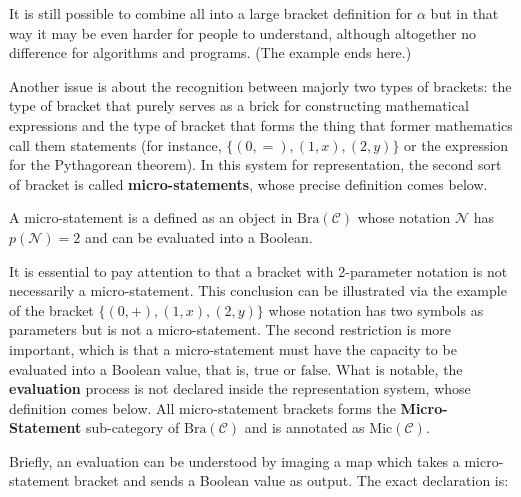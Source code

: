 \documentclass[preprint]{elsarticle}
\numberwithin{theorem}{section}	%
\numberwithin{axiom}{section}	%
\numberwithin{definition}{section}	%
\begin{document}
It is still possible to combine all into a large bracket definition for \(\alpha\) but in that way it may be even harder for people to understand, although altogether no difference for algorithms and programs. (The example ends here.)

Another issue is about the recognition between majorly two types of brackets: the type of bracket that purely serves as a brick for constructing mathematical expressions and the type of bracket that forms the thing that former mathematics call them statements (for instance, \(\{(0,=),(1,x),(2,y)\}\) or the expression for the Pythagorean theorem). In this system for representation, the second sort of bracket is called \textbf{ micro-statements}, whose precise definition comes below.

\begin{definition}
	A micro-statement is a defined as an object in \(\text{Bra}(\mathcal{C})\) whose notation \(\mathcal{N}\) has \(\mathit{p}(\mathcal{N})=2\) and can be evaluated into a Boolean.
	
	It is essential to pay attention to that a bracket with 2-parameter notation is not necessarily a micro-statement. This conclusion can be illustrated via the example of the bracket  \(\{(0,+),(1,x),(2,y)\}\) whose notation has two symbols as parameters but is not a micro-statement. The second restriction is more important, which is that a micro-statement must have the capacity to be evaluated into a Boolean value, that is, \(\text{true}\) or \(\text{false}\). What is notable, the \textbf{ evaluation} process is not declared inside the representation system, whose definition comes below. All micro-statement brackets forms the \textbf{ Micro-Statement }sub-category of \(\text{Bra}(\mathcal{C})\) and is annotated as \(\text{Mic}(\mathcal{C})\).
\end{definition}

 Briefly, an evaluation can be understood by imaging a map which takes a micro-statement bracket and sends a Boolean value as output. The exact declaration is:
\end{document}
